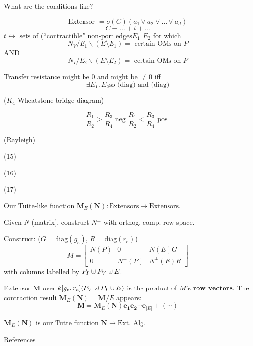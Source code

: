 \documentclass{beamer}
\newcommand{\dunion}
{\mbox{\hbox{\hskip0.45em$\cdot$\hskip-0.44em$\cup$\hskip0.2em}}}
\begin{document}
\begin{frame}{What are the conditions like?}

\[
\text{Extensor\ }= \sigma(C)(a_1\vee a_2\vee \ldots \vee a_d)
\]
\[
C = \ldots + t + \ldots
\]
$t \leftrightarrow \text{\ sets of (``contractible'' non-port edges} 
E_1, E_2$ for which
\[
N_V/E_1\backslash(E\setminus E_1) = \text{\ certain OMs on\ } P
\]
AND
\[
N_I/E_2\backslash(E\setminus E_2) = \text{\ certain OMs on\ } P
\]

Transfer resistance might be 0 and might be $\neq 0$ iff
\[
\exists E_1, E_2 \text{so (diag) and (diag)}
\]

($K_4$ Wheatstone bridge diagram)

\[
\frac{R_1}{R_2} > \frac{R_3}{R_4} 
\text{\ neg\ }
\frac{R_1}{R_2} < \frac{R_3}{R_4} 
\text{\ pos\ }
\]

\end{frame}

\begin{frame}{(Rayleigh)}
\end{frame}

\begin{frame}{(15)}

\end{frame}

\begin{frame}{(16)}
\end{frame}

\begin{frame}{(17)}


Our Tutte-like function $\mathbf{M}_E(\mathbf{N}):\text{Extensors}\rightarrow\text{Extensors}$.

Given $N$ (matrix), construct $N^\perp$ 
with orthog. comp. row space.

Construct:  ($G=\mbox{diag}(g_e)$, $R=\mbox{diag}(r_e)$)
\[
M = \left[\begin{array}{c|c|c} N(P)  &  0  &  N(E)G \\  \hline
0  & N^{\perp}(P)  &  N^{\perp}(E)R \end{array}\right]
\]
with columns labelled by $P_I\dunion P_V\dunion E$.

Extensor $\mathbf{M}$ over $k[g_e, r_e](P_V\dunion P_I \dunion E)$
is the product of $M$'s \textbf{row vectors}. The contraction result
$\mathbf{M}_E(\mathbf{N}) = \mathbf{M}/E$ appears:
\[
\mathbf{M} = \mathbf{M}_E(\mathbf{N})\mathbf{e_1}\mathbf{e_2}\cdots\mathbf{e}_{|E|} + (\cdots) 
\]

$\mathbf{M}_E(\mathbf{N})$ is our Tutte function $\mathbf{N}\rightarrow \text{Ext. Alg.}$

\end{frame}


\begin{frame}[allowframebreaks]{References}

{}
\end{frame}
\end{document}
